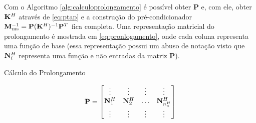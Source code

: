 Com o Algoritmo \ref{alg:calculoprolongamento} é possível obter $\mathbf{P}$ e, com ele, obter $\rigidmatrixcoarse$ através de \eqref{eq:ptap} e a construção do pré-condicionador $\preconms = \mathbf{P} (\mathbf{K}^H)^{-1} \mathbf{P}^{T}$ fica completa. Uma representação matricial do prolongamento é mostrada em \eqref{eq:pronlogamento}, onde cada coluna representa uma função de base (essa representação possui um abuso de notação visto que $\basefunctioncoarse$ representa uma função e não entradas da matriz $\mathbf{P}$).



\vspace{1cm}
\begin{algorithm}[H]
\caption{Cálculo do Prolongamento}\label{alg:calculoprolongamento}
\end{algorithm}
\vspace{1cm}






\begin{equation}\label{eq:pronlogamento}
 \mathbf{P} =\begin{bmatrix}
\vdots                    & \vdots                      & \vdots & \vdots   \\ 
 \basefunctioncoarse[1]      & \basefunctioncoarse[2]         & \hdots & \basefunctioncoarse[\qtdfreedomcoarse] \\ 
\vdots                    & \vdots                      & \vdots & \vdots 
\end{bmatrix}
\end{equation}






